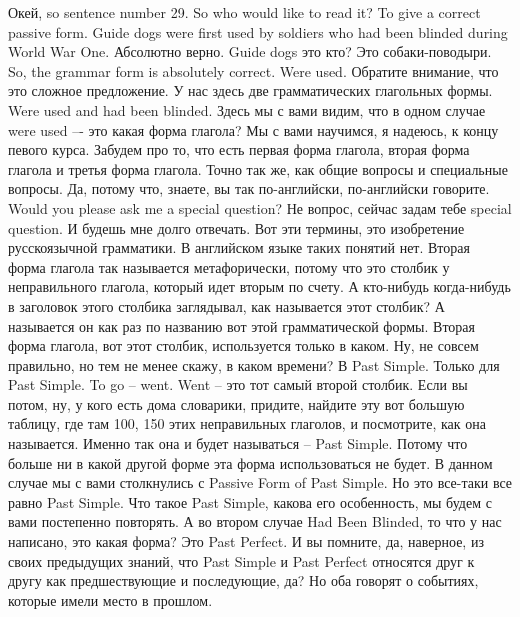 \documentclass[main.tex]{subfiles}
\begin{document}
Окей, so sentence number 29.
So who would like to read it? To give a correct passive form.
Guide dogs were first used by soldiers who had been blinded during World War One.
Абсолютно верно.
Guide dogs это кто? Это собаки-поводыри.
So, the grammar form is absolutely correct.
Were used.
Обратите внимание, что это сложное предложение.
У нас здесь две грамматических глагольных формы.
Were used and had been blinded.
Здесь мы с вами видим, что в одном случае were used –- это какая форма глагола?
Мы с вами научимся, я надеюсь, к концу певого курса.
Забудем про то, что есть первая форма глагола, вторая форма глагола и третья форма глагола.
Точно так же, как общие вопросы и специальные вопросы.
Да, потому что, знаете, вы так по-английски, по-английски говорите.
Would you please ask me a special question? Не вопрос, сейчас задам тебе special question.
И будешь мне долго отвечать.
Вот эти термины, это изобретение русскоязычной грамматики.
В английском языке таких понятий нет.
Вторая форма глагола так называется метафорически, потому что это столбик у неправильного глагола, который идет вторым по счету.
А кто-нибудь когда-нибудь в заголовок этого столбика заглядывал, как называется этот столбик? А называется он как раз по названию вот этой грамматической формы.
Вторая форма глагола, вот этот столбик, используется только в каком.
Ну, не совсем правильно, но тем не менее скажу, в каком времени?
В Past Simple.
Только для Past Simple.
To go -- went.
Went -- это тот самый второй столбик.
Если вы потом, ну, у кого есть дома словарики, придите, найдите эту вот большую таблицу, где там 100, 150 этих неправильных глаголов, и посмотрите, как она называется.
Именно так она и будет называться -- Past Simple.
Потому что больше ни в какой другой форме эта форма использоваться не будет.
В данном случае мы с вами столкнулись с Passive Form of Past Simple.
Но это все-таки все равно Past Simple.
Что такое Past Simple, какова его особенность, мы будем с вами постепенно повторять.
А во втором случае Had Been Blinded, то что у нас написано, это какая форма?
Это Past Perfect.
И вы помните, да, наверное, из своих предыдущих знаний, что Past Simple и Past Perfect относятся друг к другу как предшествующие и последующие, да?
Но оба говорят о событиях, которые имели место в прошлом.
\end{document}
